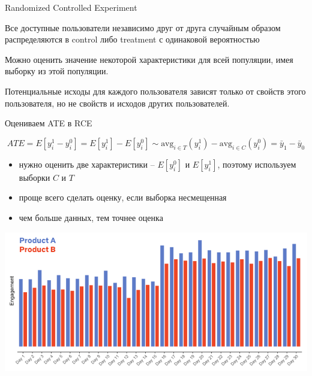 \documentclass[11pt,aspectratio=169]{beamer}
\begin{document}
\begin{frame}{Randomized Controlled Experiment}

\begin{tcolorbox}[colback=info!5,colframe=info!80,title=Схема эксперимента]
Все доступные пользователи независимо друг от друга случайным образом распределяются в control либо treatment с одинаковой вероятностью
\end{tcolorbox}

\end{frame}

\begin{frame}{\phantom{Предположения RCE}}

\begin{tcolorbox}[colback=warn!5,colframe=warn!80,title=Предположение 1: ]
Можно оценить значение некоторой характеристики для всей популяции, имея выборку из этой популяции.
\end{tcolorbox}

\vfill

\begin{tcolorbox}[colback=warn!5,colframe=warn!80,title=Предположение 2: Stable Unit Treatment Value Assumption]
Потенциальные исходы для каждого пользователя зависят только от свойств этого пользователя, но не свойств и исходов других пользователей.
\end{tcolorbox}

\end{frame}

\begin{frame}{Оцениваем ATE в RCE}

\[
ATE = E[y_i^1 - y_i^0] = E[y_i^1] - E[y_i^0] \sim \text{avg}_{i \in T}(y_i^1) - \text{avg}_{i \in C}(y_i^0) = \bar y_1 - \bar y_0
\]

\begin{itemize}
\item нужно оценить две характеристики -- $E[y_i^0]$ и $E[y_i^1]$, поэтому используем выборки $C$ и $T$
\item проще всего сделать оценку, если выборка несмещенная
\item чем больше данных, тем точнее оценка
\end{itemize}

\end{frame}

\begin{frame}{}

\begin{center}
\includegraphics[scale=0.3]{images/yesexp.png}
\end{center}

\end{frame}
\end{document}
